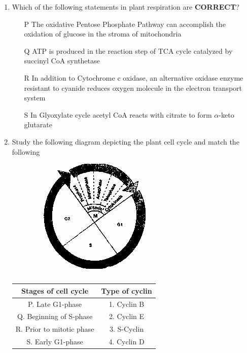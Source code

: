 \documentclass[journal,12pt,onecolumn]{IEEEtran}
\theoremstyle{remark}
\begin{document}
\begin{enumerate}
\item Which of the following statements in plant respiration are \textbf{CORRECT}?
\begin{enumerate}
    

\item[P] The oxidative Pentose Phosphate Pathway can accomplish the oxidation of glucose in the stroma of mitochondria \\
\item[Q] ATP is produced in the reaction step of TCA cycle catalyzed by succinyl CoA synthetase \\
\item[R] In addition to Cytochrome c oxidase, an alternative oxidase enzyme resistant to cyanide reduces oxygen molecule in the electron transport system \\
\item[S] In Glyoxylate cycle acetyl CoA reacts with citrate to form $\alpha$-keto glutarate
\end{enumerate}
\hfill{}
\begin{enumerate}
\end{enumerate}

\item Study the following diagram depicting the plant cell cycle and match the following
\hfill{}
\begin{figure}[H]
\centering
\includegraphics[width=0.4\columnwidth]{fig25.png}
\caption*{}
\label{fig:q19}
\end{figure}

\begin{table}[h!]
\centering
\begin{tabular}{|c|c|}
\hline
\textbf{Stages of cell cycle} & \textbf{Type of cyclin} \\
\hline
P. Late G1-phase & 1. Cyclin B \\
Q. Beginning of S-phase & 2. Cyclin E \\
R. Prior to mitotic phase & 3. S-Cyclin \\
S. Early G1-phase & 4. Cyclin D \\
\hline
\end{tabular}
\caption*{}
\label{tab:q19}
\end{table}


\end{enumerate}
\end{document}
